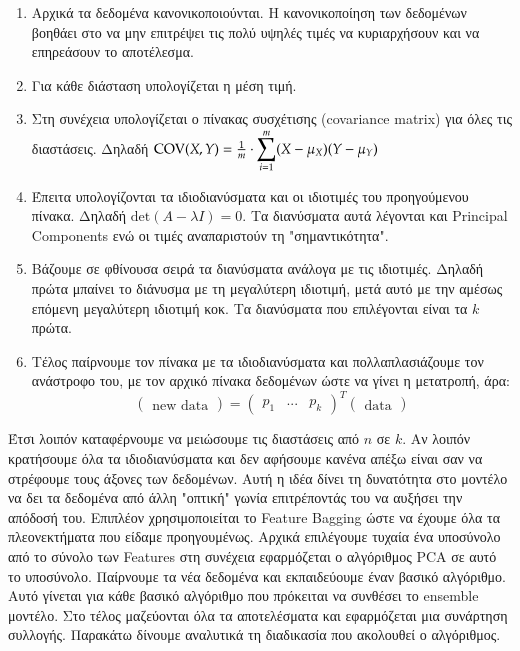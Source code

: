 \documentclass[a4paper,12pt]{report}
\theoremstyle{definitionNODot}
\begin{document}
	\begin{enumerate}
		\item Αρχικά τα δεδομένα κανονικοποιούνται. Η κανονικοποίηση των δεδομένων βοηθάει στο να μην επιτρέψει τις πολύ υψηλές τιμές να κυριαρχήσουν και να επηρεάσουν το αποτέλεσμα.
		\item Για κάθε διάσταση υπολογίζεται η μέση τιμή.
		\item Στη συνέχεια υπολογίζεται ο πίνακας συσχέτισης (covariance matrix) για όλες τις διαστάσεις. Δηλαδή $\text{COV}(X,Y) = \frac{1}{m} \cdot \mathlarger{\sum}\limits_{i=1}^{m}(X-\mu_X)(Y-\mu_Y) $
		\item Έπειτα υπολογίζονται τα ιδιοδιανύσματα και οι ιδιοτιμές του προηγούμενου πίνακα. Δηλαδή $\text{det}(A-\lambda I) = 0$. Τα διανύσματα αυτά λέγονται και Principal Components ενώ οι τιμές αναπαριστούν τη "σημαντικότητα".
		\item Bάζουμε σε φθίνουσα σειρά τα διανύσματα ανάλογα με τις ιδιοτιμές. Δηλαδή πρώτα μπαίνει το διάνυσμα με τη μεγαλύτερη ιδιοτιμή, μετά αυτό με την αμέσως επόμενη μεγαλύτερη ιδιοτιμή κοκ. Τα διανύσματα που επιλέγονται είναι τα $k$ πρώτα.
		\item Τέλος παίρνουμε τον πίνακα με τα ιδιοδιανύσματα και πολλαπλασιάζουμε τον ανάστροφο του, με τον αρχικό πίνακα δεδομένων ώστε να γίνει η μετατροπή, άρα:
		\[
		\begin{pmatrix}
			\text{new data}
		\end{pmatrix}
		=
		\begin{pmatrix}
			p_1 & ... & p_k
		\end{pmatrix} ^ T
		\begin{pmatrix}
			\text{data}
		\end{pmatrix}		
		\]
	\end{enumerate}
	Έτσι λοιπόν καταφέρνουμε να μειώσουμε τις διαστάσεις από $n$ σε $k$. Αν λοιπόν κρατήσουμε όλα τα ιδιοδιανύσματα και δεν αφήσουμε κανένα απέξω είναι σαν να στρέφουμε τους άξονες των δεδομένων. Αυτή η ιδέα δίνει τη δυνατότητα στο μοντέλο να δει τα δεδομένα από άλλη "οπτική" γωνία επιτρέποντάς του να αυξήσει την απόδοσή του. Επιπλέον χρησιμοποιείται το Feature Bagging ώστε να έχουμε όλα τα πλεονεκτήματα που είδαμε προηγουμένως. Αρχικά επιλέγουμε τυχαία ένα υποσύνολο από το σύνολο των Features στη συνέχεια εφαρμόζεται ο αλγόριθμος PCA σε αυτό το υποσύνολο. Παίρνουμε τα νέα δεδομένα και εκπαιδεύουμε έναν βασικό αλγόριθμο. Αυτό γίνεται για κάθε βασικό αλγόριθμο που πρόκειται να συνθέσει το ensemble μοντέλο. Στο τέλος μαζεύονται όλα τα αποτελέσματα και εφαρμόζεται μια συνάρτηση συλλογής. Παρακάτω δίνουμε αναλυτικά τη διαδικασία που ακολουθεί ο αλγόριθμος.
	
\end{document}
